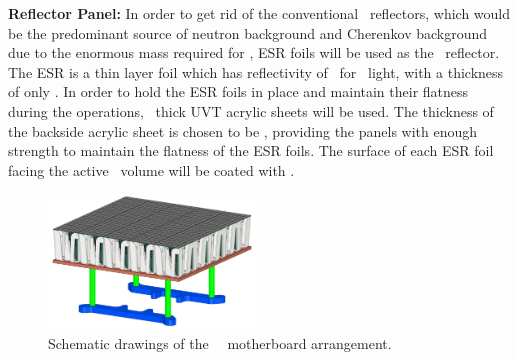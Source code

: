 {\bf Reflector Panel:} In order to get rid of the conventional \PTFE\ reflectors, which would be the predominant source of neutron background and Cherenkov background due to the enormous mass required for \DSks, ESR foils will be used as the \TPC\ reflector. The ESR is a thin layer foil which has reflectivity of \DSkESRReflectivity\ for \DSfPMTWaveLength\ light, with a thickness of only \DSkESRThickness.  In order to hold the ESR foils in place and maintain their flatness during the operations, \DSkPMMATPCBackPanelThicknessESR\ thick UVT acrylic sheets will be used. The thickness of the backside acrylic sheet is chosen to be \DSkPMMATPCBackPanelThicknessESR, providing the panels with enough strength to maintain the flatness of the ESR foils. %
The surface of each ESR foil facing the active \LAr\ volume will be coated with \TPB. 

\begin{figure}[t!]
\includegraphics[width=0.49\textwidth]{./Figures/MB_SQB.PNG}
\caption[\DSks\ \DSkPdm\ motherboard designs]{Schematic drawings of the \DSks\ \DSkPdm\ motherboard arrangement.}
\label{fig:3D-TRB-SQB}
\end{figure}

